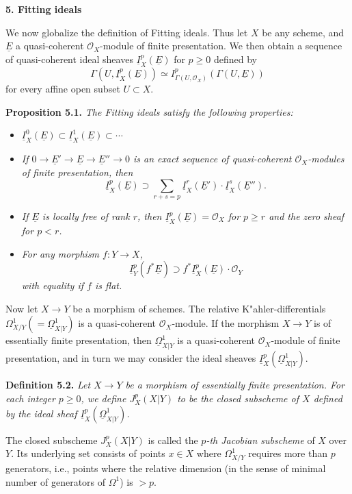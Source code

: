 \documentclass[11pt]{article}
\theoremstyle{plain}
\theoremstyle{definition}
\theoremstyle{remark}
\begin{document}
\medskip
\noindent\textbf{5. Fitting ideals}

\medskip
We now globalize the definition of Fitting ideals. Thus let $X$ be any scheme, and $\underline{E}$ a quasi-coherent $\mathcal{O}_X$-module of finite presentation. We then obtain a sequence of quasi-coherent ideal sheaves $\underline{I}_X^p(\underline{E})$ for $p \geq 0$ defined by
\[\Gamma(U, \underline{I}_X^p(\underline{E})) \simeq I_{\Gamma(U,\mathcal{O}_X)}^p(\Gamma(U, \underline{E}))\]
for every affine open subset $U \subset X$.

\medskip
\noindent\textbf{Proposition 5.1.} \textit{The Fitting ideals satisfy the following properties:}
\begin{itemize}
\item[(a)] \textit{$\underline{I}_X^0(\underline{E}) \subset \underline{I}_X^1(\underline{E}) \subset \cdots$}
\item[(b)] \textit{If $0 \to \underline{E}' \to \underline{E} \to \underline{E}'' \to 0$ is an exact sequence of quasi-coherent $\mathcal{O}_X$-modules of finite presentation, then}
\[\underline{I}_X^p(\underline{E}) \supset \sum_{r+s=p} \underline{I}_X^r(\underline{E}') \cdot \underline{I}_X^s(\underline{E}'').\]
\item[(c)] \textit{If $\underline{E}$ is locally free of rank $r$, then $\underline{I}_X^p(\underline{E}) = \mathcal{O}_X$ for $p \geq r$ and the zero sheaf for $p < r$.}
\item[(d)] \textit{For any morphism $f : Y \to X$,}
\[\underline{I}_Y^p(f^*\underline{E}) \supset f^*\underline{I}_X^p(\underline{E})\cdot \mathcal{O}_Y\]
\textit{with equality if $f$ is flat.}
\end{itemize}

\medskip
Now let $X \to Y$ be a morphism of schemes. The relative K"ahler-differentials $\Omega_{X/Y}^1 (= \underline{\Omega}_{X|Y}^1)$ is a quasi-coherent $\mathcal{O}_X$-module. If the morphism $X \to Y$ is of essentially finite presentation, then $\underline{\Omega}_{X|Y}^1$ is a quasi-coherent $\mathcal{O}_X$-module of finite presentation, and in turn we may consider the ideal sheaves $\underline{I}_X^p(\underline{\Omega}_{X|Y}^1)$.

\medskip
\noindent\textbf{Definition 5.2.} \textit{Let $X \to Y$ be a morphism of essentially finite presentation. For each integer $p \geq 0$, we define $J_X^p(X|Y)$ to be the closed subscheme of $X$ defined by the ideal sheaf $\underline{I}_X^p(\underline{\Omega}_{X|Y}^1)$.}

\medskip
The closed subscheme $J_X^p(X|Y)$ is called the \textit{$p$-th Jacobian subscheme} of $X$ over $Y$. Its underlying set consists of points $x \in X$ where $\Omega_{X/Y}^1$ requires more than $p$ generators, i.e., points where the relative dimension (in the sense of minimal number of generators of $\Omega^1$) is $> p$.
\end{document}
